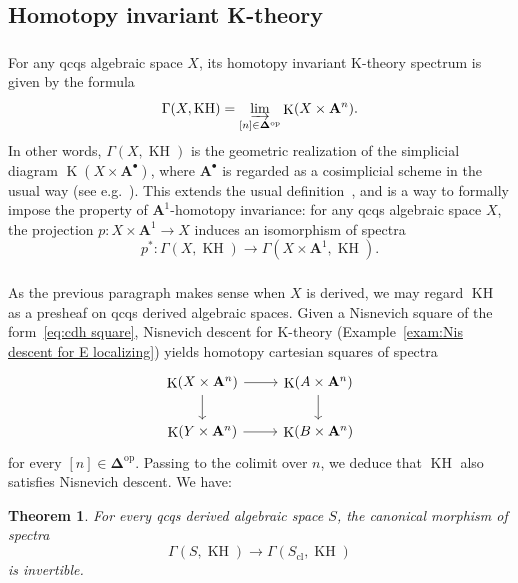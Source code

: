 \documentclass[11pt]{article}
\newtheorem{theo}{Theorem}[section]
\theoremstyle{definition}
\numberwithin{equation}{section}
\numberwithin{figure}{section}
\numberwithin{table}{section}
\newcommand{\bA}{\ensuremath{\mathbf{A}}\xspace}
\newcommand{\colim}{\varinjlim}
\newcommand{\A}{\bA}
\newcommand{\bDelta}{\mathbf{\Delta}}
\newcommand{\cl}{{\mrm{cl}}}
\DeclareMathOperator{\K}{K}
\DeclareMathOperator{\KH}{KH}
\DeclareMathOperator{\op}{op}
\newcommand{\mrm}[1]{\ensuremath{\mathrm{#1}}\xspace}
\begin{document}
\subsection{Homotopy invariant K-theory}\label{ssec:kh/kh}

\subsubsection{}

For any qcqs algebraic space $X$, its homotopy invariant K-theory spectrum is given by the formula
\begin{equation}\label{eq:Gamma(X, Lhtp(K))}
\Gamma(X, \KH) = \colim_{[n] \in \bDelta^{\op}} \K(X \times \A^n).
\end{equation}
In other words, $\Gamma(X, \KH)$ is the geometric realization of the simplicial diagram $\K(X \times \A^\bullet)$, where $\A^\bullet$ is regarded as a cosimplicial scheme in the usual way (see e.g.~\cite[p.~45]{MorelVoevodsky}). This extends the usual definition~\cite{WeibelKH,ThomasonTrobaugh}, and is a way to formally impose the property of $\A^1$-homotopy invariance: for any qcqs algebraic space $X$, the projection $p : X \times \A^1 \to X$ induces an isomorphism of spectra
\[
p^* : \Gamma(X, \KH) \to \Gamma(X \times \A^1, \KH).
\]

\subsubsection{}\label{sssec:KH derived}

As the previous paragraph makes sense when $X$ is derived, we may regard $\KH$ as a presheaf on qcqs derived algebraic spaces. Given a Nisnevich square of the form~\eqref{eq:cdh square}, Nisnevich descent for K-theory (Example~\ref{exam:Nis descent for E localizing}) yields homotopy cartesian squares of spectra
\[
\begin{tikzcd}
\K(X \times \A^n) \ar{r}\ar{d} & \K(A \times \A^n) \ar{d}
\\
\K(Y \times \A^n) \ar{r} & \K(B \times \A^n)
\end{tikzcd}
\]
for every $[n] \in \bDelta^{\op}$. Passing to the colimit over $n$, we deduce that $\KH$ also satisfies Nisnevich descent. We have:

\begin{theo}\label{thm:KH nil}
For every qcqs derived algebraic space $S$, the canonical morphism of spectra
\[
\Gamma(S, \KH) \to \Gamma(S_\cl, \KH)
\]
is invertible.
\end{theo}
\end{document}
